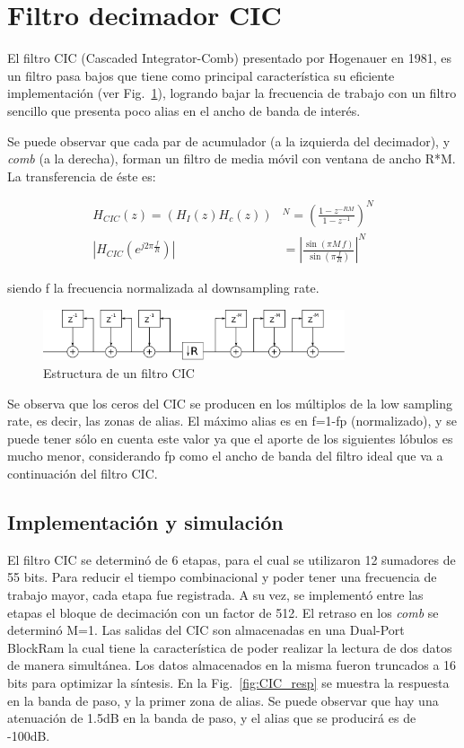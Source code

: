 \documentclass[a4paper,conference]{IEEEtran}
\begin{document}
\section{Filtro decimador CIC}
El filtro CIC (Cascaded Integrator-Comb) presentado por Hogenauer en 1981\cite{CIC:Hog},  es un filtro pasa bajos que tiene como principal caracter\'istica su eficiente implementaci\'on (ver Fig.~\ref{fig:CIC_top}), logrando bajar la frecuencia de trabajo con un filtro sencillo que presenta poco alias en el ancho de banda de interés.

Se puede observar que cada par de acumulador (a la izquierda del decimador), y \textit{comb} (a la derecha), forman un filtro de media m\'ovil con ventana de ancho R*M. La transferencia de \'este es:

\begin{align}
H_{CIC}(z)= \left( H_I(z) H_c(z)\right)& ^{N}=\left( \frac{1-z^{-RM}}{1-z^{-1}}\right) ^N\\
\left| H_{CIC}(e^{j2\pi\frac{f}{R}})\right| &=\left| \frac{\sin(\pi M\,f)}{\sin(\pi \frac{f}{R})}\right| ^{N}
\end{align}

siendo f la frecuencia normalizada al downsampling rate.\\

\begin{figure}[!h]
	\centering
	\includegraphics[width=3.5in]{CIC_Topologia}
	\caption{Estructura de un filtro CIC}
	\label{fig:CIC_top}
\end{figure}

Se observa que los ceros del CIC se producen en los m\'ultiplos de la low sampling rate, es decir, las zonas de alias. El m\'aximo alias es en f=1-fp (normalizado), y se puede tener s\'olo en cuenta este valor ya que el aporte de los siguientes l\'obulos es mucho menor, considerando fp como el ancho de banda del filtro ideal que va a continuación del filtro CIC.

\subsection{Implementaci\'on y simulaci\'on}
El filtro CIC se determin\'o de 6 etapas, para el cual se utilizaron 12 sumadores de 55 bits. Para reducir el tiempo combinacional y poder tener una frecuencia de trabajo mayor, cada etapa fue registrada. A su vez, se implement\'o entre las etapas el bloque de decimaci\'on con un factor de 512. El retraso en los \textit{comb} se determin\'o M=1. Las salidas del CIC son almacenadas en una Dual-Port BlockRam\cite{Sp6-BR} la cual tiene la caracter\'istica de poder realizar la lectura de dos datos de manera simultánea. Los datos almacenados en la misma fueron truncados a 16 bits para optimizar la síntesis. En la Fig.~\ref{fig:CIC_resp} se muestra la respuesta en la banda de paso, y la primer zona de alias. Se puede observar que hay una atenuación de 1.5dB en la banda de paso, y el alias que se producirá es de -100dB.
\end{document}
